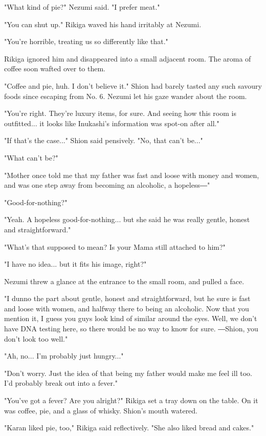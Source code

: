 "What kind of pie?" Nezumi said. "I prefer meat."

"You can shut up." Rikiga waved his hand irritably at Nezumi.

"You're horrible, treating us so differently like that."

Rikiga ignored him and disappeared into a small adjacent room. The aroma
of coffee soon wafted over to them.

"Coffee and pie, huh. I don't believe it." Shion had barely tasted any
such savoury foods since escaping from No. 6. Nezumi let his gaze wander
about the room.

"You're right. They're luxury items, for sure. And seeing how this room
is outfitted... it looks like Inukashi's information was spot-on after
all."

"If that's the case..." Shion said pensively. "No, that can't be..."

"What can't be?"

"Mother once told me that my father was fast and loose with money and
women, and was one step away from becoming an alcoholic, a hopeless―"

"Good-for-nothing?"

"Yeah. A hopeless good-for-nothing... but she said he was really gentle,
honest and straightforward."

"What's that supposed to mean? Is your Mama still attached to him?"

"I have no idea... but it fits his image, right?"

Nezumi threw a glance at the entrance to the small room, and pulled a
face.

"I dunno the part about gentle, honest and straightforward, but he sure
is fast and loose with women, and halfway there to being an alcoholic.
Now that you mention it, I guess you guys look kind of similar around
the eyes. Well, we don't have DNA testing here, so there would be no way
to know for sure. ―Shion, you don't look too well."

"Ah, no... I'm probably just hungry..."

"Don't worry. Just the idea of that being my father would make me feel
ill too. I'd probably break out into a fever."

"You've got a fever? Are you alright?" Rikiga set a tray down on the
table. On it was coffee, pie, and a glass of whisky. Shion's mouth
watered.

"Karan liked pie, too," Rikiga said reflectively. "She also liked bread
and cakes."

